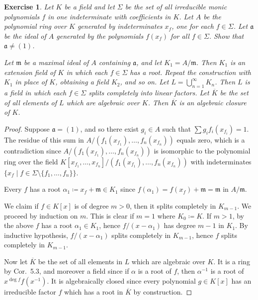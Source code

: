\documentclass[12pt,letterpaper]{article}
\newtheorem{problem}{Exercise}[section]
\theoremstyle{definition}
\theoremstyle{remark}
\numberwithin{figure}{problem}
\numberwithin{equation}{section}
\begin{document}
\begin{problem}
  Let
  $K$ be a field and let
  $\Sigma$ be the set of all irreducible monic polynomials
  $f$ in one indeterminate with coefficients in
  $K$.
  Let
  $A$ be the polynomial ring over
  $K$ generated by indeterminates
  $x_f$, one for each
  $f \in
  \Sigma$.
  Let
  $\mathfrak{a}$ be the ideal of
  $A$ generated by the polynomials
  $f(x_f)$ for all
  $f \in
  \Sigma$.
  Show that
  $\mathfrak{a} \ne
  (1)$.
  \par Let
  $\mathfrak{m}$ be a maximal ideal of
  $A$ containing
  $\mathfrak{a}$, and let
  $K_1 =
  A/\mathfrak{m}$.
  Then
  $K_1$ is an extension field of
  $K$ in which each
  $f \in
  \Sigma$ has a root.
  Repeat the construction with
  $K_1$ in place of
  $K$, obtaining a field
  $K_2$, and so on.
  Let
  $L = \bigcup_{n=1}^\infty
  K_n$.
  Then
  $L$ is a field in which each
  $f \in
  \Sigma$ splits completely into linear factors.
  Let
  $\overline{K}$ be the set of all elements of
  $L$ which are algebraic over
  $K$.
  Then
  $\overline{K}$ is an algebraic closure of
  $K$.
\end{problem}
\begin{proof}
  Suppose
  $\mathfrak{a} =
  (1)$, and so there exist
  $g_i \in
  A$ such that
  $\sum g_if_i(x_{f_i}) =
  1$.
  The residue of this sum in
  $A/(f_1(x_{f_1}),\ldots,f_n(x_{f_n}))$ equals zero, which is a contradiction since
  $A/(f_1(x_{f_1}),\ldots,f_n(x_{f_n}))$ is isomorphic to the polynomial ring over the field
  $K[x_{f_1},\ldots,x_{f_n}]/(f_1(x_{f_1}),\ldots,f_n(x_{f_n}))$ with indeterminates
  $\{x_f \mid f \in \Sigma \setminus
    \{f_1,\ldots,f_n\}\}$.
  \par Every
  $f$ has a root
  $\alpha_1 \coloneqq x_f + \mathfrak{m} \in
  K_1$ since
  $f(\alpha_1) = f(x_f) + \mathfrak{m} =
  \mathfrak{m}$ in
  $A/\mathfrak{m}$.
  \par We claim if
  $f \in
  K[x]$ is of degree
  $m>0$, then it splits completely in
  $K_{m-1}$.
  We proceed by induction on
  $m$.
  This is clear if
  $m=1$ where
  $K_0 \coloneqq
  K$.
  If
  $m >
  1$, by the above
  $f$ has a root
  $\alpha_1 \in
  K_{1}$, hence
  $f/(x-\alpha_1)$ has degree
  $m-1$ in
  $K_{1}$.
  By inductive hypothesis,
  $f/(x-\alpha_1)$ splits completely in
  $K_{m-1}$, hence
  $f$ splits completely in
  $K_{m-1}$.
  \par Now let
  $\overline{K}$ be the set of all elements in
  $L$ which are algebraic over
  $K$.
  It is a ring by Cor.~5.3, and moreover a field since if
  $\alpha$ is a root of
  $f$, then
  $\alpha^{-1}$ is a root of
  $x^{\deg
    f}f(x^{-1})$.
  It is algebraically closed since every polynomial
  $g \in
  K[x]$ has an irreducible factor
  $f$ which has a root in
  $\overline{K}$ by construction.
\end{proof}
\end{document}

